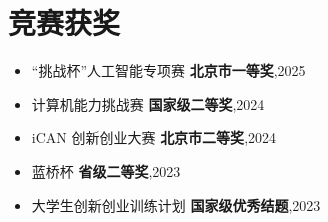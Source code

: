 \documentclass{resume}
\begin{document}
\section{竞赛获奖}
\begin{itemize}[parsep=0.1ex]
  \item “挑战杯”人工智能专项赛 \textbf{北京市一等奖},2025
  \item 计算机能力挑战赛 \textbf{国家级二等奖},2024
  \item iCAN 创新创业大赛 \textbf{北京市二等奖},2024
  \item 蓝桥杯 \textbf{省级二等奖},2023
  \item 大学生创新创业训练计划 \textbf{国家级优秀结题},2023
\end{itemize}





%
%
\end{document}
